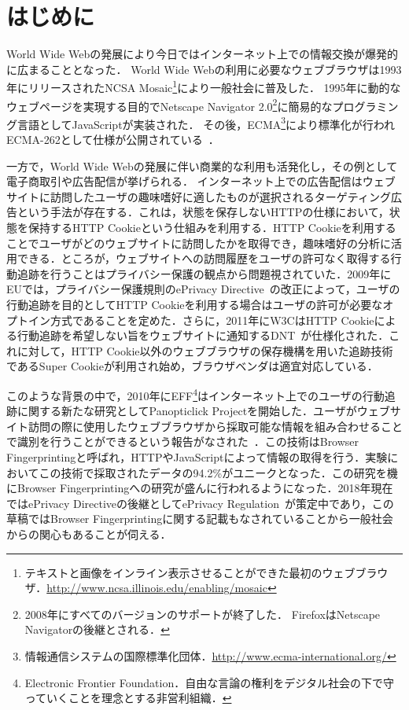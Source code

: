 \section{はじめに}
World Wide Webの発展により今日ではインターネット上での情報交換が爆発的に広まることとなった．
World Wide Webの利用に必要なウェブブラウザは1993年にリリースされたNCSA Mosaic\footnote{テキストと画像をインライン表示させることができた最初のウェブブラウザ．\url{http://www.ncsa.illinois.edu/enabling/mosaic}}により一般社会に普及した．
1995年に動的なウェブページを実現する目的でNetscape Navigator 2.0\footnote{2008年にすべてのバージョンのサポートが終了した．
FirefoxはNetscape Navigatorの後継とされる．}に簡易的なプログラミング言語としてJavaScriptが実装された．
その後，ECMA\footnote{情報通信システムの国際標準化団体．\url{http://www.ecma-international.org/}}により標準化が行われECMA-262として仕様が公開されている~\cite{ecma_262}．

一方で，World Wide Webの発展に伴い商業的な利用も活発化し，その例として電子商取引や広告配信が挙げられる．
インターネット上での広告配信はウェブサイトに訪問したユーザの趣味嗜好に適したものが選択されるターゲティング広告という手法が存在する．これは，状態を保存しないHTTPの仕様において，状態を保持するHTTP Cookieという仕組みを利用する．HTTP Cookieを利用することでユーザがどのウェブサイトに訪問したかを取得でき，趣味嗜好の分析に活用できる．ところが，ウェブサイトへの訪問履歴をユーザの許可なく取得する行動追跡を行うことはプライバシー保護の観点から問題視されていた．2009年にEUでは，プライバシー保護規則のePrivacy Directive~\cite{ePrivacy_directive}の改正によって，ユーザの行動追跡を目的としてHTTP Cookieを利用する場合はユーザの許可が必要なオプトイン方式であることを定めた．さらに，2011年にW3CはHTTP Cookieによる行動追跡を希望しない旨をウェブサイトに通知するDNT~\cite{dnt}が仕様化された．これに対して，HTTP Cookie以外のウェブブラウザの保存機構を用いた追跡技術であるSuper Cookieが利用され始め，ブラウザベンダは適宜対応している．

このような背景の中で，2010年にEFF\footnote{Electronic Frontier Foundation．自由な言論の権利をデジタル社会の下で守っていくことを理念とする非営利組織．}はインターネット上でのユーザの行動追跡に関する新たな研究としてPanopticlick Projectを開始した．ユーザがウェブサイト訪問の際に使用したウェブブラウザから採取可能な情報を組み合わせることで識別を行うことができるという報告がなされた~\cite{eckersley2010unique}．この技術はBrowser Fingerprintingと呼ばれ，HTTPやJavaScriptによって情報の取得を行う．実験においてこの技術で採取されたデータの94.2\%がユニークとなった．この研究を機にBrowser Fingerprintingへの研究が盛んに行われるようになった．2018年現在ではePrivacy Directiveの後継としてePrivacy Regulation~\cite{ePrivacy_regulation}が策定中であり，この草稿ではBrowser Fingerprintingに関する記載もなされていることから一般社会からの関心もあることが伺える．

